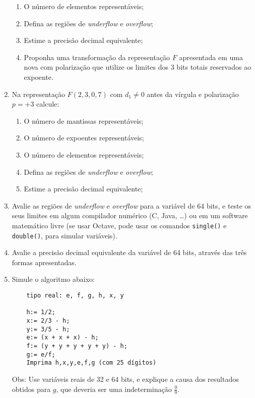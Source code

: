 \documentclass[12pt]{article}
\newenvironment{smallitem}{
    \vspace{-2mm}
    \begin{enumerate}
    \setlength{\parskip}{0pt}
    \setlength{\itemsep}{2pt}
}{
    \vspace{-2mm}
    \end{enumerate}
}
\begin{document}
\begin{enumerate}[label=\textbf{\arabic*})]
\begin{smallitem}
\item O número de elementos representáveis;

\item Defina as regiões de \textit{underflow} e \textit{overflow};

\item Estime a precisão decimal equivalente;

\item Proponha uma transformação da representação $F$ apresentada em uma nova
com polarização que utilize os limites dos 3 bits totais reservados ao expoente.

\end{smallitem}

\item Na representação $F(2,3,0,7)$ com $d_1 \neq 0$ antes da vírgula e
polarização $p = +3$ calcule:

\begin{smallitem}

\item O número de mantissas representáveis;

\item O número de expoentes representáveis;

\item O número de elementos representáveis;

\item Defina as regiões de \textit{underflow} e \textit{overflow};

\item Estime a precisão decimal equivalente;

\end{smallitem}

\item Avalie as regiões de \textit{underflow} e \textit{overflow} para a
variável de 64 bits, e teste os seus limites em algum compilador numérico (C,
Java, \dots) ou em um software matemático livre (se usar Octave, pode usar os
comandos \verb!single()! e \verb!double()!, para simular variáveis).

\item Avalie a precisão decimal equivalente da variável de 64 bits, através das
três formas apresentadas.

\item Simule o algoritmo abaixo:
\begin{verbatim}
    tipo real: e, f, g, h, x, y

    h:= 1/2;
    x:= 2/3 - h;
    y:= 3/5 - h;
    e:= (x + x + x) - h;
    f:= (y + y + y + y + y) - h;
    g:= e/f;
    Imprima h,x,y,e,f,g (com 25 dígitos)\end{verbatim}
Obs: Use variáveis reais de 32 e 64 bits, e explique a causa dos resultados
obtidos para $g$, que deveria ser uma indeterminação $\frac{0}{0}$.


\end{enumerate}
\end{document}
